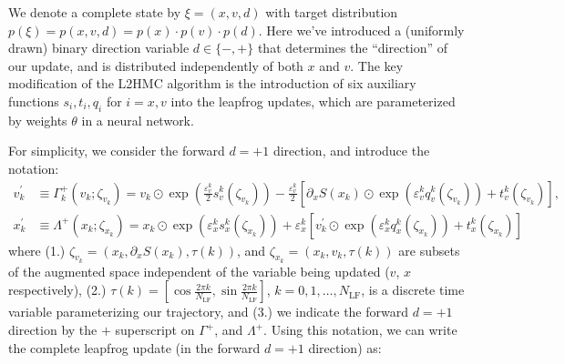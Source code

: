 \documentclass{article} %
\begin{document}
We denote a complete state by \(\xi = (x, v, d)\) with target distribution \(p(\xi) = p(x, v, d) = p(x)\cdot p(v)\cdot
p(d)\).
%
Here we've introduced a (uniformly drawn) binary direction variable \(d\in\{-,+\}\) that determines the ``direction'' of
our update, and is distributed independently of both \(x\) and \(v\).
%
The key modification of the L2HMC algorithm is the introduction of six auxiliary functions \(s_{i}, t_{i}, q_{i}\) for \(i
= x, v\) into the leapfrog updates, which are parameterized by weights \(\theta\) in a neural network.
%
%

For simplicity, we consider the forward \(d=+1\) direction, and introduce the notation:
%
\begin{align}
   v^{\prime}_{k} &\equiv \Gamma^{+}_{k}(v_{k};\zeta_{v_{k}})
   = v_{k}\odot \exp{\left(\tfrac{\varepsilon^{k}_{v}}{2}s_{v}^{k}(\zeta_{v_{k}})\right)} -
   \tfrac{\varepsilon^{k}_{v}}{2}{\left[\partial_{x}S(x_{k})\odot\exp{\left(\varepsilon^{k}_{v} q_{v}^{k}(\zeta_{v_{k}})\right)}
      +t_{v}^{k}(\zeta_{v_{k}})\right]},\label{eq:new_momentum_update}\\
   x^{\prime}_{k} &\equiv \Lambda^{+}(x_{k};\zeta_{x_{k}})
   = x_{k}\odot\exp(\varepsilon^{k}_{x} s^{k}_{x}(\zeta_{x_{k}}))
   + \varepsilon^{k}_{x}\left[v^{\prime}_{k}\odot\exp(\varepsilon^{k}_{x} q^{k}_{x}(\zeta_{x_{k}}))
         + t^{k}_{x}(\zeta_{x_{k}})\right]\label{eq:new_position_update}
\end{align}
%
where (1.) \(\zeta_{v_{k}} = (x_{k}, \partial_{x}S(x_{k}), \tau(k))\), and \(\zeta_{x_{k}} = (x_{k}, v_{k}, \tau(k))\)
are subsets of the augmented space independent of the variable being updated (\(v\), \(x\) respectively), (2.) \(\tau(k)
= {\left[\cos\tfrac{2\pi k}{N_{\mathrm{LF}}}, \sin\tfrac{2\pi k}{N_{\mathrm{LF}}}\right]}\), \(k = 0, 1, \ldots,
N_{\mathrm{LF}}\), is a discrete time variable parameterizing our trajectory, and (3.) we indicate the forward \(d=+1\)
direction by the \(+\) superscript on \(\Gamma^{+}\), and \(\Lambda^{+}\).
%
Using this notation, we can write the complete leapfrog update (in the forward \(d=+1\) direction) as:
%
\end{document}
